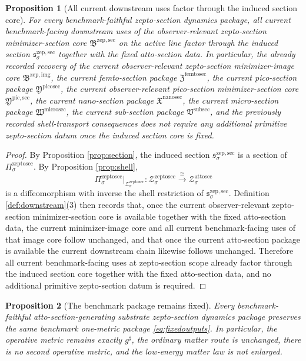 \documentclass[11pt]{article}
\newcommand{\CompletedMetric}{g^{\sharp}}
\newcommand{\SubSectionPackage}{\mathfrak V^{\mathrm{subsec}}}
\newcommand{\MicroSectionPackage}{\mathfrak W^{\mathrm{microsec}}}
\newcommand{\NanoSectionPackage}{\mathfrak X^{\mathrm{nanosec}}}
\newcommand{\PicoSectionPackage}{\mathfrak Y^{\mathrm{picosec}}}
\newcommand{\PicoMinSectionCore}{\mathfrak Y^{\mathrm{pic,sec}}}
\newcommand{\FemtoSectionPackage}{\mathfrak Z^{\mathrm{femtosec}}}
\newcommand{\AttoSectionShell}[1]{\mathcal Z_{#1}^{\mathrm{attosec}}}
\newcommand{\ZeptoSectionProj}[1]{\Pi_{#1}^{\mathrm{zeptosec}}}
\newcommand{\ZeptoSectionShell}[1]{\mathcal Z_{#1}^{\mathrm{zeptosec}}}
\newcommand{\ZeptoImageCore}{\mathfrak B^{\mathrm{zep,img}}}
\newcommand{\ZeptoMinSectionCore}{\mathfrak B^{\mathrm{zep,sec}}}
\newcommand{\ZeptoMinSection}[1]{\mathfrak s_{#1}^{\mathrm{zep,sec}}}
\newtheorem{proposition}{Proposition}
\begin{document}
\begin{proposition}[All current downstream uses factor through the induced section core]
\label{prop:downstream}
For every benchmark-faithful zepto-section dynamics package, all current benchmark-facing downstream uses of the observer-relevant zepto-section minimizer-section core \(\ZeptoMinSectionCore\) on the active line factor through the induced section \(\ZeptoMinSection{\sigma}\) together with the fixed atto-section data. In particular, the already recorded recovery of the current observer-relevant zepto-section minimizer-image core \(\ZeptoImageCore\), the current femto-section package \(\FemtoSectionPackage\), the current pico-section package \(\PicoSectionPackage\), the current observer-relevant pico-section minimizer-section core \(\PicoMinSectionCore\), the current nano-section package \(\NanoSectionPackage\), the current micro-section package \(\MicroSectionPackage\), the current sub-section package \(\SubSectionPackage\), and the previously recorded shell-transport consequences does not require any additional primitive zepto-section datum once the induced section core is fixed.
\end{proposition}

\begin{proof}
By Proposition \ref{prop:section}, the induced section \(\ZeptoMinSection{\sigma}\) is a section of \(\ZeptoSectionProj{\sigma}\). By Proposition \ref{prop:shell},
\[
\ZeptoSectionProj{\sigma}\big|_{\ZeptoSectionShell{\sigma}}
:
\ZeptoSectionShell{\sigma}\xrightarrow{\cong}\AttoSectionShell{\sigma}
\]
is a diffeomorphism with inverse the shell restriction of \(\ZeptoMinSection{\sigma}\). Definition \ref{def:downstream}(3) then records that, once the current observer-relevant zepto-section minimizer-section core is available together with the fixed atto-section data, the current minimizer-image core and all current benchmark-facing uses of that image core follow unchanged, and that once the current atto-section package is available the current downstream chain likewise follows unchanged. Therefore all current benchmark-facing uses at zepto-section scope already factor through the induced section core together with the fixed atto-section data, and no additional primitive zepto-section datum is required.
\end{proof}

\begin{proposition}[The benchmark package remains fixed]
\label{prop:benchmark}
Every benchmark-faithful atto-section-generating substrate zepto-section dynamics package preserves the same benchmark one-metric package \eqref{eq:fixedoutputs}. In particular, the operative metric remains exactly \(\CompletedMetric\), the ordinary matter route is unchanged, there is no second operative metric, and the low-energy matter law is not enlarged.
\end{proposition}
\end{document}
